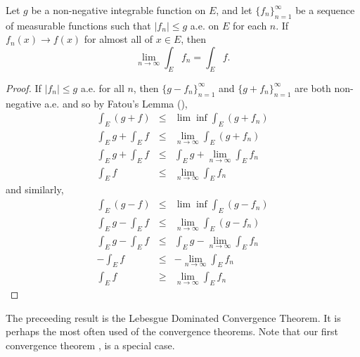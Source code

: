 \pagebreak
\begin{pblm}\label{p:lebesguedominatedconvergence}%
	Let $g$ be a non-negative integrable function on $E$, and let $\{f_n\}_{n=1}^\infty$ 
	be a sequence of measurable functions such that $|f_n| \le g$ a.e. on $E$ for each 
	$n$. If $f_n(x) \rightarrow f(x)$ for almost all of $x \in E$, then 
	\begin{equation*}
		\lim\limits_{n\to\infty}\int_Ef_n = \int_Ef. 
	\end{equation*}
\begin{proof}
	If $|f_n| \le g$ a.e. for all $n$, then 
	$\{g - f_n\}_{n=1}^\infty$ and $\{g + f_n\}_{n=1}^\infty$ are both non-negative a.e. 
	and so by Fatou's Lemma (), 
	\begin{equation*}
	\begin{array}{rcl}
		\int_E(g+f) & \le & \lim\inf\int_E(g+f_n) \\ 
		\int_Eg + \int_E f & \le & \lim\limits_{n\to\infty}\int_E(g+f_n)\\
		\int_Eg + \int_Ef & \le & \int_Eg + \lim\limits_{n\to\infty}\int_Ef_n\\
		\int_Ef & \le & \lim\limits_{n\to\infty}\int_Ef_n
	\end{array}
	\end{equation*}
	and similarly, 
	\begin{equation*}
	\begin{array}{rcl}
		\int_E(g-f) & \le & \lim\inf\int_E(g-f_n) \\ 
		\int_Eg - \int_E f & \le & \lim\limits_{n\to\infty}\int_E(g-f_n)\\
		\int_Eg - \int_Ef & \le & \int_Eg - \lim\limits_{n\to\infty}\int_Ef_n\\
		-\int_Ef & \le & -\lim\limits_{n\to\infty}\int_Ef_n\\
		\int_Ef & \ge & \lim\limits_{n\to\infty}\int_Ef_n
	\end{array}
	\end{equation*}
\end{proof}
\end{pblm}

\begin{rmk}%
	The preceeding result is the Lebesgue Dominated Convergence Theorem. It is perhaps the 
	most often used of the convergence theorems. Note that our first convergence theorem 
	, is a special case. 
\end{rmk}

